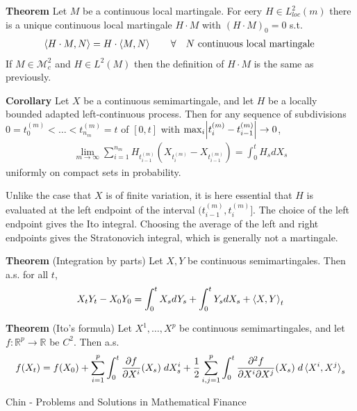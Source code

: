 \documentclass[hidelinks, 12pt]{article}
\theoremstyle{mydefstyle}
\theoremstyle{mythmstyle}
\begin{document}
\textbf{Theorem} Let $M$ be a continuous local martingale. For eery $H \in L^2_{loc}(m)$ there is a unique continuous local martingale $H \cdot M$ with $(H \cdot M)_0 = 0$ s.t.
\begin{gather*}
\braket{H \cdot M, N} = H \cdot \braket{M, N} \qquad \forall \quad N \mbox{ continuous local martingale }
\end{gather*}
If $M \in \mathcal{M}^2_c$ and $H \in L^2(M)$ then the definition of $H \cdot M$ is the same as previously.

\textbf{Corollary} Let $X$ be a continuous semimartingale, and let $H$ be a locally bounded adapted left-continuous process. Then for any sequence of subdivisions $0 = t_0^{(m)} < \dots < t_{n_m}^{(m)} = t$ of $[0, t]$ with $\max_i \abs{t_i^{(m)} - t_{i-1}^{(m)}} \to 0$,
\begin{gather*}
\lim_{m \to \infty} \sum_{i = 1}^{n_m} H_{t_{i-1}^{(m)}} \left( X_{t_i^{(m)}} - X_{t_{i-1}^{(m)}} \right) = \int_0^t H_s dX_s
\end{gather*}
uniformly on compact sets in probability. 

Unlike the case that $X$ is of finite variation, it is here essential that $H$ is evaluated at the left endpoint of the interval $(t_{i-1}^{(m)}, t_i^{(m)}]$. The choice of the left endpoint gives the Ito integral. Choosing the average of the left and right endpoints gives the Stratonovich integral, which is generally not a martingale. 

\textbf{Theorem} (Integration by parts) Let $X, Y$ be continuous semimartingales. Then a.s. for all $t$,
\begin{gather*}
X_t Y_t - X_0 Y_0 = \int_0^t X_s dY_s + \int_0^t Y_s dX_s + \braket{X, Y}_t
\end{gather*}

\textbf{Theorem} (Ito's formula) Let $X^1, \dots, X^p$ be continuous semimartingales, and let $f : \mathbb{R}^p \to \mathbb{R}$ be $C^2$. Then a.s.
\begin{gather*}
f(X_t) = f(X_0) + \sum_{i = 1}^p \int_0^t \frac{\partial f}{\partial X^i}(X_s) \hspace{1mm} dX^i_s + \frac{1}{2} \sum_{i, j = 1}^p \int_0^t \frac{\partial^2 f}{\partial X^i \partial X^j}(X_s) \hspace{1mm} d\braket{X^i, X^j}_s
\end{gather*}

\newpage

Chin - Problems and Solutions in Mathematical Finance
\end{document}
